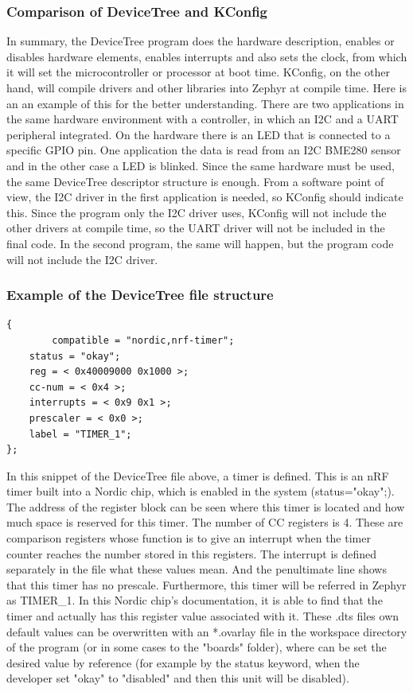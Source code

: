 \subsubsection{Comparison of DeviceTree and KConfig}
In summary, the DeviceTree program does the hardware description, enables or disables hardware elements, enables interrupts and also sets the clock, from which it will set the microcontroller or processor at boot time. KConfig, on the other hand, will compile drivers and other libraries into Zephyr at compile time. Here is an an example of this for the better understanding. There are two applications in the same hardware environment with a controller, in which an I2C and a UART peripheral integrated. On the hardware there is an LED that is connected to a specific GPIO pin. One application the data is read from an I2C BME280 sensor and in the other case a LED is blinked. Since the same hardware must be used, the same DeviceTree descriptor structure is enough. From a software point of view, the I2C driver in the first application is needed, so KConfig should indicate this. Since the program only the I2C driver uses, KConfig will not include the other drivers at compile time, so the UART driver will not be included in the final code. In the second program, the same will happen, but the program code will not include the I2C driver.

\clearpage
\subsubsection{Example of the DeviceTree file structure}
\begin{lstlisting}
{
        compatible = "nordic,nrf-timer";
	status = "okay";
	reg = < 0x40009000 0x1000 >;
	cc-num = < 0x4 >;
	interrupts = < 0x9 0x1 >;
	prescaler = < 0x0 >;
	label = "TIMER_1";
};
\end{lstlisting}
\noindent
In this snippet of the DeviceTree file above, a timer is defined. This is an nRF timer built into a Nordic chip, which is enabled in the system (status="okay";). The address of the register block can be seen where this timer is located and how much space is reserved for this timer. The number of CC registers is 4. These are comparison registers whose function is to give an interrupt when the timer counter reaches the number stored in this registers. The interrupt is defined separately in the file what these values mean. And the penultimate line shows that this timer has no prescale. Furthermore, this timer will be referred in Zephyr as TIMER\_1. In this Nordic chip's documentation, it is able to find that the timer and actually has this register value associated with it. These .dts files own default values can be overwritten with an *.ovarlay file in the workspace directory of the program (or in some cases to the "boards" folder), where can be set the desired value by reference (for example by the status keyword, when the developer set "okay" to "disabled" and then this unit will be disabled).
\newline

